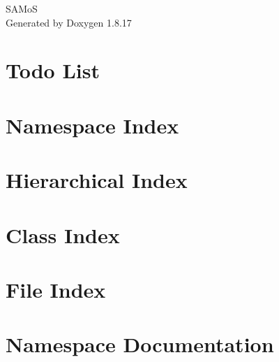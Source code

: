 \let\mypdfximage\pdfximage\def\pdfximage{\immediate\mypdfximage}\documentclass[twoside]{book}
\newcommand{\+}{\discretionary{\mbox{\scriptsize$\hookleftarrow$}}{}{}}
\newcommand{\clearemptydoublepage}{%
  \newpage{\pagestyle{empty}\cleardoublepage}%
}
\begin{document}
\begin{titlepage}
\vspace*{7cm}
\begin{center}%
{\Large S\+A\+MoS }\\
\vspace*{1cm}
{\large Generated by Doxygen 1.8.17}\\
\end{center}
\end{titlepage}
\clearemptydoublepage
{}
\tableofcontents
\clearemptydoublepage
{}

\chapter{Todo List}
\label{todo}

\chapter{Namespace Index}

\chapter{Hierarchical Index}

\chapter{Class Index}

\chapter{File Index}

\chapter{Namespace Documentation}

\end{document}
